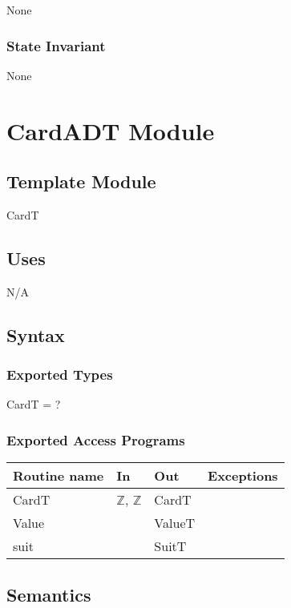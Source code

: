 \documentclass[12pt]{article}
\begin{document}
None

\subsubsection* {State Invariant}

None

\newpage

\section* {CardADT Module}

\subsection*{Template Module}

CardT

\subsection* {Uses}

N/A

\subsection* {Syntax}

\subsubsection* {Exported Types}

CardT = ?

\subsubsection* {Exported Access Programs}

\begin{tabular}{| l | l | l | l |}
\hline
\textbf{Routine name} & \textbf{In} & \textbf{Out} & \textbf{Exceptions}\\
\hline
CardT & $\mathbb{Z}$, $\mathbb{Z}$ & CardT & \\
\hline
Value & ~ & ValueT & ~\\
\hline
suit & ~ & SuitT & ~\\
\hline
\end{tabular}

\subsection* {Semantics}
\end{document}
